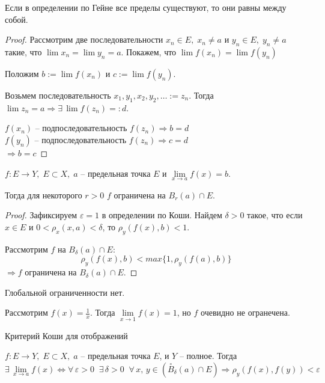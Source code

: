 \begin{theorem-non}
    Если в определении по Гейне все пределы существуют, то они равны между собой. 
\end{theorem-non}
\begin{proof}
    Рассмотрим две последовательности $x_n \in E, \; x_n \neq a$ и $y_n \in E, \; y_n \neq a$ такие, что $\lim x_n = \lim y_n = a$. Покажем, что $\lim f(x_n) = \lim f(y_n)$
    
    Положим $b := \lim f(x_n)$ и $c := \lim f(y_n)$.

    Возьмем последовательность $x_1, y_1, x_2, y_2, \dots := z_n$. Тогда $\lim z_n = a \Rightarrow \exists \, \lim f(z_n) =: d$.
    
    $f(x_n)$ -- подпоследовательность $f(z_n) \Rightarrow b = d$ \\
    $f(y_n)$ -- подпоследовательность $f(z_n) \Rightarrow c = d$ \\
    $\Rightarrow b = c$
\end{proof}

\begin{theorem-non}
    $f : E \to Y, \; E \subset X, \; a$ -- предельная точка $E$ и $\lim\limits_{x \to a} f(x) = b$. 

    Тогда для некоторого $r > 0$ $f$ ограничена на $B_r(a) \cap E$. 
\end{theorem-non}
\begin{proof}
    Зафиксируем $\varepsilon = 1$ в определении по Коши. Найдем $\delta > 0$ такое, что если $x \in E$ и $0 < \rho_x(x, a) < \delta$, то $\rho_y(f(x), b) < 1$.

    Рассмотрим $f$ на $B_{\delta}(a) \cap E$:
    \[ \rho_y(f(x), b) < max \{1, \rho_y(f(a), b)\} \]
    $\Rightarrow f$ ограничена на $B_{\delta}(a) \cap E$.
\end{proof}
\begin{notice}
    Глобальной ограниченности нет. 

    Рассмотрим $f(x) = \frac{1}{x}$. Тогда $\lim\limits_{x \to 1} f(x) = 1$, но $f$ очевидно не огранечена.
\end{notice}

\vspace{7mm}

\begin{theorem-non}
    Критерий Коши для отображений

$f : E \to Y, \; E \subset X, \; a$ -- предельная точка $E$, и $Y$ -- полное. Тогда
\[ \exists \, \lim_{x \to a} f(x) \Longleftrightarrow \forall \, \varepsilon > 0 \;\; \exists \, \delta > 0 \;\; \forall \, x, \, y \in (\overset{\circ}{B}_{\delta}(a) \cap E) \Rightarrow \rho_y(f(x), f(y)) < \varepsilon \]
\end{theorem-non}

